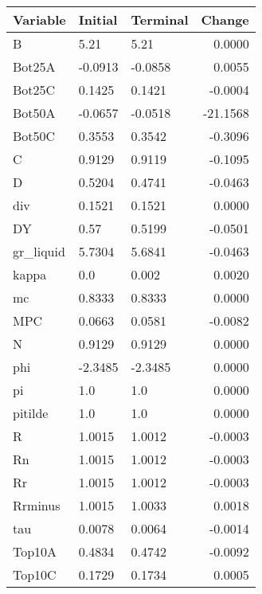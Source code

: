 \begin{table}
\centering
\label{tab:stst_comparison_baseline_wedge_permanent}
\begin{tabular}{lllr}
\toprule
                Variable & Initial & Terminal &   Change \\
\midrule
                       B &    5.21 &     5.21 &   0.0000 \\
                  Bot25A & -0.0913 &  -0.0858 &   0.0055 \\
                  Bot25C &  0.1425 &   0.1421 &  -0.0004 \\
                  Bot50A & -0.0657 &  -0.0518 & -21.1568 \\
                  Bot50C &  0.3553 &   0.3542 &  -0.3096 \\
                       C &  0.9129 &   0.9119 &  -0.1095 \\
                       D &  0.5204 &   0.4741 &  -0.0463 \\
                     div &  0.1521 &   0.1521 &   0.0000 \\
                      DY &    0.57 &   0.5199 &  -0.0501 \\
               gr\_liquid &  5.7304 &   5.6841 &  -0.0463 \\
                   kappa &     0.0 &    0.002 &   0.0020 \\
                      mc &  0.8333 &   0.8333 &   0.0000 \\
                     MPC &  0.0663 &   0.0581 &  -0.0082 \\
                       N &  0.9129 &   0.9129 &   0.0000 \\
                     phi & -2.3485 &  -2.3485 &   0.0000 \\
                      pi &     1.0 &      1.0 &   0.0000 \\
                 pitilde &     1.0 &      1.0 &   0.0000 \\
                       R &  1.0015 &   1.0012 &  -0.0003 \\
                      Rn &  1.0015 &   1.0012 &  -0.0003 \\
                      Rr &  1.0015 &   1.0012 &  -0.0003 \\
                 Rrminus &  1.0015 &   1.0033 &   0.0018 \\
                     tau &  0.0078 &   0.0064 &  -0.0014 \\
                  Top10A &  0.4834 &   0.4742 &  -0.0092 \\
                  Top10C &  0.1729 &   0.1734 &   0.0005 \\

\end{tabular}
\end{table}
